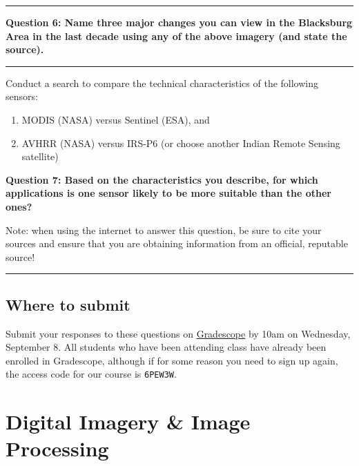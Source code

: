 \documentclass[
]{article}
\providecommand{\tightlist}{%
  \setlength{\itemsep}{0pt}\setlength{\parskip}{0pt}}
\begin{document}
\begin{center}\rule{0.5\linewidth}{0.5pt}\end{center}

\textbf{Question 6: Name three major changes you can view in the Blacksburg Area in the last decade using any of the above imagery (and state the source).}

\begin{center}\rule{0.5\linewidth}{0.5pt}\end{center}

Conduct a search to compare the technical characteristics of the following sensors:

\begin{enumerate}
\def\labelenumi{(\roman{enumi})}
\tightlist
\item
  MODIS (NASA) versus Sentinel (ESA), and
\item
  AVHRR (NASA) versus IRS-P6 (or choose another Indian Remote Sensing satellite)
\end{enumerate}

\textbf{Question 7: Based on the characteristics you describe, for which applications is one sensor likely to be more suitable than the other ones? }

Note: when using the internet to answer this question, be sure to cite your sources and ensure that you are obtaining information from an official, reputable source!

\begin{center}\rule{0.5\linewidth}{0.5pt}\end{center}

\hypertarget{where-to-submit}{%
\subsection*{Where to submit}\label{where-to-submit}}

Submit your responses to these questions on \href{https://www.gradescope.com/courses/293173/assignments/1446622/submissions}{Gradescope} by 10am on Wednesday, September 8. All students who have been attending class have already been enrolled in Gradescope, although if for some reason you need to sign up again, the access code for our course is \texttt{6PEW3W}.

\hypertarget{lab2}{%
\section{Digital Imagery \& Image Processing}\label{lab2}}
\end{document}
